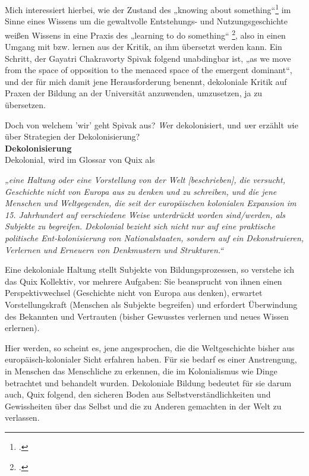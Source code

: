 Mich interessiert hierbei, wie der Zustand des „knowing about
something“\footnotemark \footcitetext{spivak} im
Sinne eines Wissens um die gewaltvolle Entstehungs- und Nutzungsgeschichte
weißen Wissens in eine Praxis des „learning to do something“\footnotemark
\footcitetext{spivak}, also in einen Umgang mit bzw. lernen aus der Kritik, an
ihm übersetzt werden kann. Ein Schritt, der Gayatri Chakravorty Spivak folgend
unabdingbar ist, „as we move from the space of opposition to the menaced space
of the emergent dominant“\footnotemark{}, und der für mich damit jene Herausforderung
benennt, dekoloniale Kritik auf Praxen der Bildung an der Universität
anzuwenden, umzusetzen, ja zu übersetzen.

Doch von welchem 'wir' geht Spivak
aus? \textit{W}er dekolonisiert, und \textit{w}er erzählt \textit{w}ie über Strategien der
Dekolonisierung?\\

\textbf{\large Dekolonisierung}\\
Dekolonial, wird im Glossar von Quix\footnotemark{} als
\begin{myenv} \textit{„eine Haltung oder eine Vorstellung von der Welt
  [beschrieben], die versucht, Geschichte nicht von Europa aus zu denken und zu
schreiben, und die jene Menschen und Weltgegenden, die seit der europäischen
kolonialen Expansion im 15. Jahrhundert auf verschiedene Weise unterdrückt
worden sind/werden, als Subjekte zu begreifen. Dekolonial bezieht sich nicht
nur auf eine praktische politische Ent-kolonisierung von Nationalstaaten,
sondern auf ein Dekonstruieren, Verlernen und Erneuern von Denkmustern und
Strukturen.“\footnotemark{}} \end{myenv}

Eine dekoloniale Haltung stellt Subjekte von Bildungsprozessen, so verstehe ich
das Quix Kollektiv, vor mehrere Aufgaben: Sie beansprucht von ihnen einen
Perspektivwechsel (Geschichte nicht von Europa aus denken), erwartet
Vorstellungskraft (Menschen als Subjekte begreifen) und erfordert Überwindung
des Bekannten und Vertrauten (bisher Gewusstes verlernen und neues Wissen
erlernen).

Hier werden, so scheint es, jene angesprochen, die die Weltgeschichte bisher
aus europäisch-kolonialer Sicht erfahren haben. Für sie bedarf es einer
Anstrengung, in Menschen das Menschliche zu erkennen, die im Kolonialismus wie
Dinge betrachtet und behandelt wurden. Dekoloniale Bildung bedeutet für sie
darum auch, Quix folgend, den sicheren Boden aus Selbstverständlichkeiten und
Gewissheiten über das Selbst und die zu Anderen gemachten in der Welt zu
verlassen.

